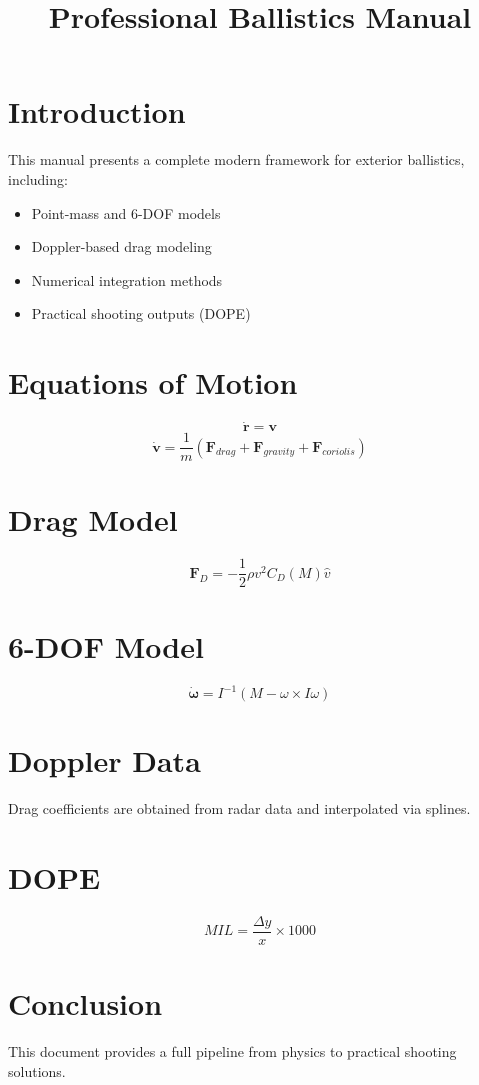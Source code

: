 \documentclass[11pt]{article}
\title{Professional Ballistics Manual}
\date{}
\begin{document}
\maketitle

\section{Introduction}
This manual presents a complete modern framework for exterior ballistics, including:
\begin{itemize}
\item Point-mass and 6-DOF models
\item Doppler-based drag modeling
\item Numerical integration methods
\item Practical shooting outputs (DOPE)
\end{itemize}

\section{Equations of Motion}
\[
\dot{\bm{r}} = \bm{v}
\]
\[
\dot{\bm{v}} = \frac{1}{m}(\bm{F}_{drag} + \bm{F}_{gravity} + \bm{F}_{coriolis})
\]

\section{Drag Model}
\[
\bm{F}_D = -\frac{1}{2} \rho v^2 C_D(M)\hat{v}
\]

\section{6-DOF Model}
\[
\dot{\bm{\omega}} = I^{-1}(M - \omega \times I\omega)
\]

\section{Doppler Data}
Drag coefficients are obtained from radar data and interpolated via splines.

\section{DOPE}
\[
MIL = \frac{\Delta y}{x} \times 1000
\]

\section{Conclusion}
This document provides a full pipeline from physics to practical shooting solutions.
\end{document}
